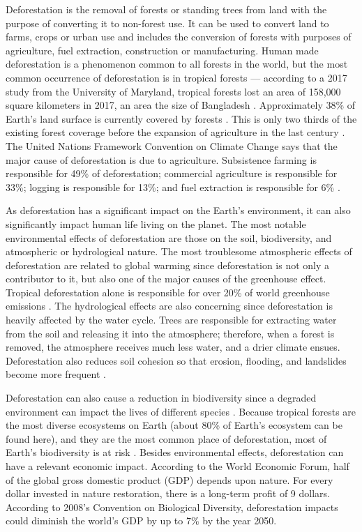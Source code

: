 Deforestation is the removal of forests or standing trees from land
with the purpose of converting it to non-forest use. It can be used to convert land to farms,
crops or urban use and includes the conversion of forests with purposes of agriculture, fuel extraction,
construction or manufacturing. Human made deforestation is a phenomenon common to all forests in the world, but
the most common occurrence of deforestation is in tropical forests \cite{Alina} --- according to a 2017 study from the University of Maryland,
tropical forests lost an area of 158,000 square kilometers in 2017, an area the size of Bangladesh \cite{maryland}. Approximately 38\% of Earth's land surface is currently covered by forests \cite{WWF}. This is only two thirds of the existing
forest coverage before the expansion of agriculture in the last century \cite{WID}. The United Nations Framework Convention on Climate Change
says that the major cause of deforestation is due to agriculture. Subsistence farming is responsible for 49\% of deforestation; commercial agriculture
is responsible for 33\%; logging is responsible for 13\%; and fuel extraction is responsible for 6\% \cite{UNFCCC}.

As deforestation has a significant impact on the Earth's environment, it can also significantly impact human life living on the planet. The most notable environmental effects of deforestation are those on the soil, biodiversity, and atmospheric or hydrological nature. The most troublesome atmospheric effects of deforestation are related to global warming since deforestation is not only a contributor to it, but also
one of the major causes of the greenhouse effect. Tropical deforestation alone is responsible for over 20\% of world greenhouse emissions \cite{Chirac}. The hydrological effects are also concerning since deforestation is heavily affected by the water cycle. Trees are responsible for extracting water from the soil and releasing it into the atmosphere; therefore, when a forest is removed, the atmosphere receives much less water, and a drier climate ensues. Deforestation also reduces soil cohesion so that erosion, flooding, and landslides become more frequent \cite{Rogge}.

Deforestation can also cause a reduction in biodiversity since a degraded environment can impact the lives of different species  \cite{umich}. Because tropical forests are the most diverse ecosystems on Earth (about 80\% of Earth's ecosystem can be found here), and they are the most common place of deforestation, most of Earth's biodiversity is at risk \cite{Mogato}. Besides environmental effects, deforestation can have a relevant economic impact. According to the World Economic Forum, half of the global gross domestic product (GDP) depends upon nature. For every dollar invested in nature restoration, there is a long-term profit of 9 dollars. According to 2008's Convention on Biological Diversity, deforestation impacts could diminish the world's GDP by up to 7\% by the year 2050.

